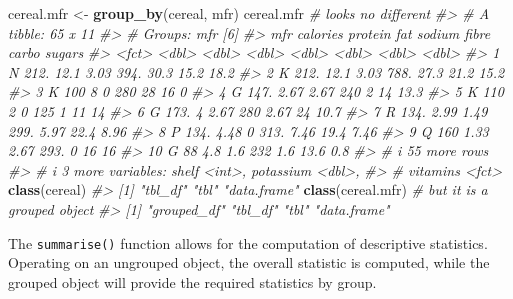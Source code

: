 \documentclass[
]{book}
\newenvironment{Shaded}{\begin{snugshade}}{\end{snugshade}}
\newcommand{\CommentTok}[1]{\textcolor[rgb]{0.56,0.35,0.01}{\textit{#1}}}
\newcommand{\FunctionTok}[1]{\textcolor[rgb]{0.13,0.29,0.53}{\textbf{#1}}}
\newcommand{\NormalTok}[1]{#1}
\newcommand{\OtherTok}[1]{\textcolor[rgb]{0.56,0.35,0.01}{#1}}
\begin{document}
\begin{Shaded}
\begin{Highlighting}[]
\NormalTok{cereal.mfr }\OtherTok{\textless{}{-}} \FunctionTok{group\_by}\NormalTok{(cereal, mfr)}
\NormalTok{cereal.mfr          }\CommentTok{\# looks no different}
\CommentTok{\#\textgreater{} \# A tibble: 65 x 11}
\CommentTok{\#\textgreater{} \# Groups:   mfr [6]}
\CommentTok{\#\textgreater{}    mfr   calories protein   fat sodium fibre carbo sugars}
\CommentTok{\#\textgreater{}    \textless{}fct\textgreater{}    \textless{}dbl\textgreater{}   \textless{}dbl\textgreater{} \textless{}dbl\textgreater{}  \textless{}dbl\textgreater{} \textless{}dbl\textgreater{} \textless{}dbl\textgreater{}  \textless{}dbl\textgreater{}}
\CommentTok{\#\textgreater{}  1 N         212.   12.1   3.03   394. 30.3   15.2  18.2 }
\CommentTok{\#\textgreater{}  2 K         212.   12.1   3.03   788. 27.3   21.2  15.2 }
\CommentTok{\#\textgreater{}  3 K         100     8     0      280  28     16     0   }
\CommentTok{\#\textgreater{}  4 G         147.    2.67  2.67   240   2     14    13.3 }
\CommentTok{\#\textgreater{}  5 K         110     2     0      125   1     11    14   }
\CommentTok{\#\textgreater{}  6 G         173.    4     2.67   280   2.67  24    10.7 }
\CommentTok{\#\textgreater{}  7 R         134.    2.99  1.49   299.  5.97  22.4   8.96}
\CommentTok{\#\textgreater{}  8 P         134.    4.48  0      313.  7.46  19.4   7.46}
\CommentTok{\#\textgreater{}  9 Q         160     1.33  2.67   293.  0     16    16   }
\CommentTok{\#\textgreater{} 10 G          88     4.8   1.6    232   1.6   13.6   0.8 }
\CommentTok{\#\textgreater{} \# i 55 more rows}
\CommentTok{\#\textgreater{} \# i 3 more variables: shelf \textless{}int\textgreater{}, potassium \textless{}dbl\textgreater{},}
\CommentTok{\#\textgreater{} \#   vitamins \textless{}fct\textgreater{}}
\FunctionTok{class}\NormalTok{(cereal)}
\CommentTok{\#\textgreater{} [1] "tbl\_df"     "tbl"        "data.frame"}
\FunctionTok{class}\NormalTok{(cereal.mfr)   }\CommentTok{\# but it is a grouped object}
\CommentTok{\#\textgreater{} [1] "grouped\_df" "tbl\_df"     "tbl"        "data.frame"}
\end{Highlighting}
\end{Shaded}

The \texttt{summarise()} function allows for the computation of descriptive statistics. Operating on an ungrouped object, the overall statistic is computed, while the grouped object will provide the required statistics by group.
\end{document}
